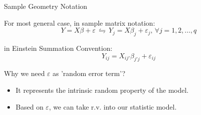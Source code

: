 \begin{point}
    Sample Geometry Notation
\end{point}

    For most general case, in sample matrix notation:
    \begin{equation}
        Y=X\beta+\varepsilon \,\leftrightharpoons\, Y_j=X\beta _j+\varepsilon _j,\,\forall j=1,2,\ldots,q
    \end{equation}
    
    in Einstein Summation Convention:
    \begin{equation}
        Y_{ij}=X_{ij'}\beta _{j'j} +\varepsilon _{ij}
    \end{equation}

    Why we need $ \varepsilon $ as 'random error term'?
    \begin{itemize}[topsep=3pt,itemsep=1pt]
        \item It represents the intrinsic random property of the model.
        \item Based on $ \varepsilon  $, we can take r.v. into our statistic model.
    \end{itemize}
    
